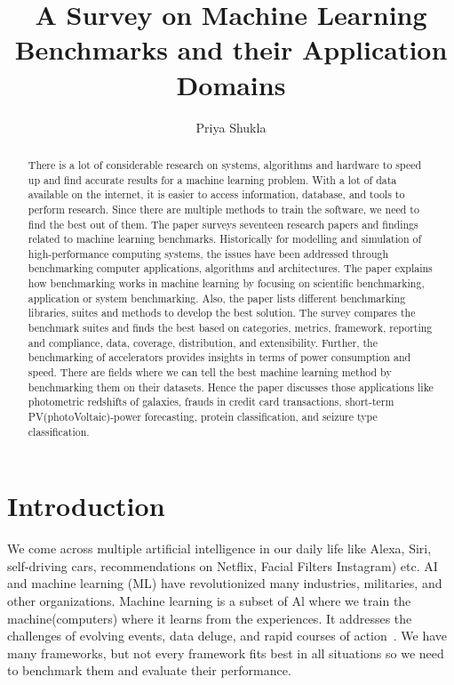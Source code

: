 \documentclass[a4paper,UKenglish,cleveref, autoref, thm-restate]{lipics-v2021}
\title{A Survey on Machine Learning Benchmarks and their Application Domains } %
\author{Priya Shukla}{Ulm University, Germany}{Priya.shukla@uni-ulm.de}{}{}%
\begin{document}
\maketitle

\begin{abstract}
There is a lot of considerable research on systems, algorithms and hardware to speed up and find accurate results for a machine learning problem. With a lot of data available on the internet, it is easier to access information, database, and tools to perform research. Since there are multiple methods to train the software, we need to find the best out of them. The paper surveys seventeen research papers and findings related to machine learning benchmarks. Historically for modelling and simulation of high-performance computing systems, the issues have been addressed through benchmarking computer applications, algorithms and architectures. The paper explains how benchmarking works in machine learning by focusing on scientific benchmarking, application or system benchmarking. Also, the paper lists different benchmarking libraries, suites and methods to develop the best solution. The survey compares the benchmark suites and finds the best based on categories, metrics, framework, reporting and compliance, data, coverage, distribution, and extensibility. Further, the benchmarking of accelerators provides insights in terms of power consumption and speed. There are fields where we can tell the best machine learning method by benchmarking them on their datasets. Hence the paper discusses those applications like photometric redshifts of galaxies, frauds in credit card transactions, short-term PV(photoVoltaic)-power forecasting, protein classification, and seizure type classification.
\end{abstract}

\section{ Introduction}
\label{introduction}
 
We come across multiple artificial intelligence in our daily life like Alexa, Siri, self-driving cars, recommendations on Netflix, Facial Filters Instagram) etc. AI and machine learning (ML) have revolutionized many industries, militaries, and other organizations. Machine learning is a subset of Al where we train the machine(computers) where it learns from the experiences. It addresses the challenges of evolving events, data deluge, and rapid courses of action~\cite{accele}. We have many frameworks, but not every framework fits best in all situations so we need to benchmark them and evaluate their performance.
\end{document}

